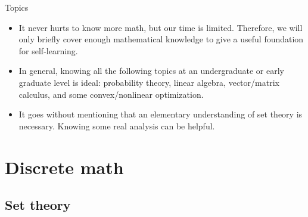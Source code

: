 \documentclass{beamer}
\begin{document}
\begin{frame}{Topics}
    \begin{itemize}
        \item
        It never hurts to know more math, but our time is limited. Therefore,
        we will only briefly cover enough mathematical knowledge to give a
        useful foundation for self-learning.

        \item
        In general, knowing all the following topics at an undergraduate or
        early graduate level is ideal: probability theory, linear algebra,
        vector/matrix calculus, and some convex/nonlinear optimization.

        \item
        It goes without mentioning that an elementary understanding of set
        theory is necessary. Knowing some real analysis can be helpful.
    \end{itemize}
\end{frame}

\section{Discrete math}

\subsection{Set theory}
\end{document}
